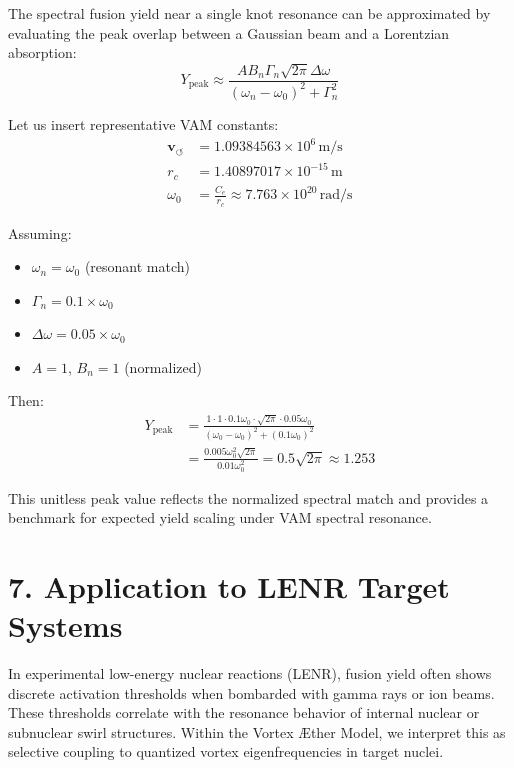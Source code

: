 The spectral fusion yield near a single knot resonance can be approximated by evaluating the peak overlap between a Gaussian beam and a Lorentzian absorption:
\begin{equation}
Y_{\text{peak}} \approx \frac{A B_n \Gamma_n \sqrt{2\pi} \Delta \omega}{(\omega_n - \omega_0)^2 + \Gamma_n^2}
\end{equation}

Let us insert representative VAM constants:
\begin{align*}
\mathbf{v}_{\scriptscriptstyle\boldsymbol{\circlearrowleft}} &= 1.09384563 \times 10^6 \, \text{m/s} \\
r_c &= 1.40897017 \times 10^{-15} \, \text{m} \\
\omega_0 &= \frac{C_e}{r_c} \approx 7.763 \times 10^{20} \, \text{rad/s}
\end{align*}

Assuming:
\begin{itemize}
  \item $\omega_n = \omega_0$ (resonant match)
  \item $\Gamma_n = 0.1 \times \omega_0$
  \item $\Delta \omega = 0.05 \times \omega_0$
  \item $A = 1$, $B_n = 1$ (normalized)
\end{itemize}

Then:
\begin{align*}
Y_{\text{peak}} &= \frac{1 \cdot 1 \cdot 0.1 \omega_0 \cdot \sqrt{2\pi} \cdot 0.05 \omega_0}{(\omega_0 - \omega_0)^2 + (0.1 \omega_0)^2} \\
&= \frac{0.005 \omega_0^2 \sqrt{2\pi}}{0.01 \omega_0^2} = 0.5 \sqrt{2\pi} \approx 1.253
\end{align*}

This unitless peak value reflects the normalized spectral match and provides a benchmark for expected yield scaling under VAM spectral resonance.
\section*{7. Application to LENR Target Systems}

In experimental low-energy nuclear reactions (LENR), fusion yield often shows discrete activation thresholds when bombarded with gamma rays or ion beams. These thresholds correlate with the resonance behavior of internal nuclear or subnuclear swirl structures. Within the Vortex Æther Model, we interpret this as selective coupling to quantized vortex eigenfrequencies in target nuclei.

